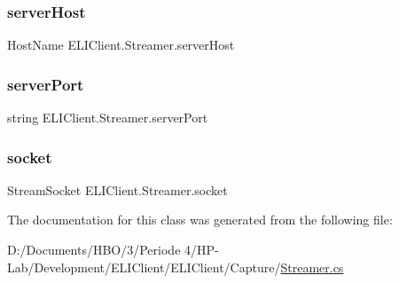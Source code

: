 \subsubsection{\texorpdfstring{server\+Host}{serverHost}}
{\footnotesize\ttfamily Host\+Name E\+L\+I\+Client.\+Streamer.\+server\+Host\hspace{0.3cm}{\ttfamily [private]}}

\mbox{\label{class_e_l_i_client_1_1_streamer_ae6c3da0a3fb272c0a50260e4049659f0}} 
\subsubsection{\texorpdfstring{server\+Port}{serverPort}}
{\footnotesize\ttfamily string E\+L\+I\+Client.\+Streamer.\+server\+Port\hspace{0.3cm}{\ttfamily [private]}}

\mbox{\label{class_e_l_i_client_1_1_streamer_a3f9f039a53e135e6545efe8e336d23a6}} 
\subsubsection{\texorpdfstring{socket}{socket}}
{\footnotesize\ttfamily Stream\+Socket E\+L\+I\+Client.\+Streamer.\+socket\hspace{0.3cm}{\ttfamily [private]}}



The documentation for this class was generated from the following file\+:\begin{DoxyCompactItemize}
\item 
D\+:/\+Documents/\+H\+B\+O/3/\+Periode 4/\+H\+P-\/\+Lab/\+Development/\+E\+L\+I\+Client/\+E\+L\+I\+Client/\+Capture/\hyperlink{_streamer_8cs}{Streamer.\+cs}\end{DoxyCompactItemize}
